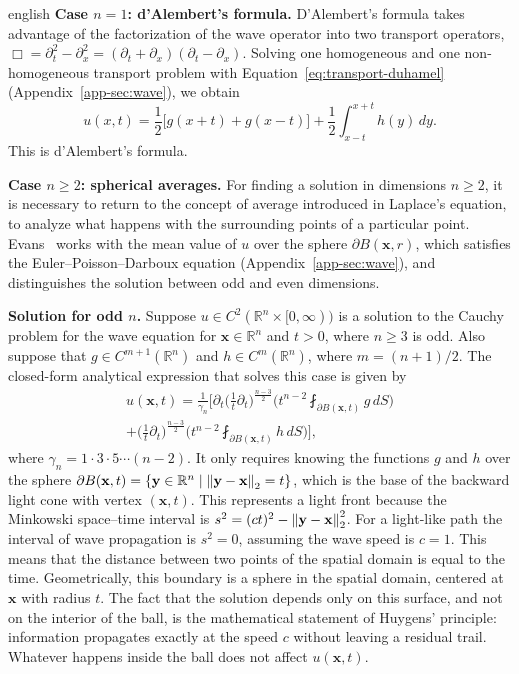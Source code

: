 \begin{hyphenrules}{english}
\textbf{Case $n=1$: d'Alembert's formula.}
D'Alembert's formula takes advantage of the factorization of the wave operator into two transport
operators, $\Box=\partial_t^2-\partial_x^2=(\partial_t+\partial_x)(\partial_t-\partial_x)$. Solving one
homogeneous and one non-homogeneous transport problem with Equation~\eqref{eq:transport-duhamel}
(Appendix~\ref{app-sec:wave}), we obtain
\begin{equation}
  u(x,t)=\frac12\big[g(x+t)+g(x-t)\big]+\frac12\int_{x-t}^{x+t}h(y)\,d y.
  \label{eq:dalembert}
\end{equation}
This is d'Alembert's formula.

\textbf{Case $n\ge2$: spherical averages.}
For finding a solution in dimensions $n\ge2$, it is necessary to return to the concept of average
introduced in Laplace's equation, to analyze what happens with the surrounding points of a particular
point. Evans~\cite{evans2010} works with the mean value of $u$ over the sphere $\partial B(\mathbf{x},r)$,
which satisfies the Euler--Poisson--Darboux equation (Appendix~\ref{app-sec:wave}), and distinguishes the
solution between odd and even dimensions.

\textbf{Solution for odd $n$.}
Suppose $u\in C^2(\mathbb{R}^n\times[0,\infty))$ is a solution to the Cauchy problem for the wave equation for
$\mathbf{x}\in\mathbb{R}^n$ and $t>0$, where $n\ge3$ is odd. Also suppose that $g\in C^{m+1}(\mathbb{R}^n)$ and
$h\in C^m(\mathbb{R}^n)$, where $m=(n+1)/2$. The closed-form analytical expression that solves this case is
given by \cite{evans2010}
\begin{multline}
  u(\mathbf{x},t)=\frac{1}{\gamma_n}\Bigg[\partial_t\Big(\frac1t\partial_t\Big)^{\frac{n-3}{2}}
    \Big(t^{n-2}\fint_{\partial B(\mathbf{x},t)}g\,d S\Big)\\
    +\Big(\frac1t\partial_t\Big)^{\frac{n-3}{2}}\Big(t^{n-2}\fint_{\partial B(\mathbf{x},t)}h\,d S\Big)\Bigg],
  \label{eq:wave-odd}
\end{multline}
where $\gamma_n=1\cdot3\cdot5\cdots(n-2)$. It only requires knowing the functions $g$ and $h$ over the
sphere $\partial B(\mathbf{x},t)=\{\mathbf{y}\in\mathbb{R}^n\mid\left\lVert \mathbf{y}-\mathbf{x} \right\rVert_2=t\}$, which is the base of the backward light
cone with vertex $(\mathbf{x},t)$. This represents a light front because the Minkowski space--time interval is
$s^2=(ct)^2-\left\lVert \mathbf{y}-\mathbf{x} \right\rVert_2^2$. For a light-like path the interval of wave propagation is $s^2=0$,
assuming the wave speed is $c=1$. This means that the distance between two points of the spatial domain
is equal to the time. Geometrically, this boundary is a sphere in the spatial domain, centered at $\mathbf{x}$
with radius $t$. The fact that the solution depends only on this surface, and not on the interior of
the ball, is the mathematical statement of Huygens' principle: information propagates exactly at the
speed $c$ without leaving a residual trail. Whatever happens inside the ball does not affect $u(\mathbf{x},t)$.


\end{hyphenrules}

